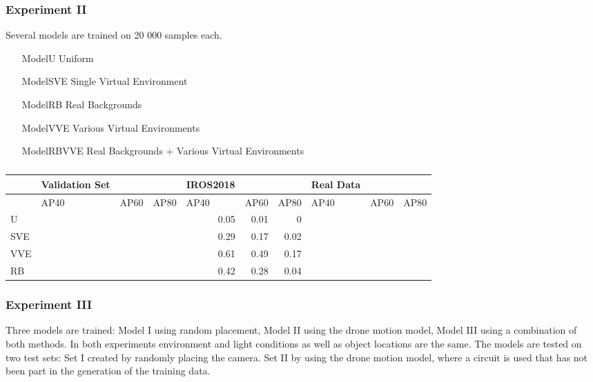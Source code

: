 \subsubsection{Experiment II}

Several models are trained on 20 000 samples each.
\begin{itemize}
	\item[ModelU] Uniform
	\item[ModelSVE] Single Virtual Environment
	\item[ModelRB] Real Backgrounds
	\item[ModelVVE] Various Virtual Environments
	\item[ModelRBVVE] Real Backgrounds + Various Virtual Environments
\end{itemize}


\begin{table}[htbp]
	\caption{}
	\begin{tabular}{|l|l|l|l|r|r|r|l|l|l|}
		\hline
		& Validation Set &  &  & \multicolumn{1}{l|}{IROS2018} & \multicolumn{1}{l|}{} & \multicolumn{1}{l|}{} & Real Data &  &  \\ \hline
		& AP40 & AP60 & AP80 & \multicolumn{1}{l|}{AP40} & \multicolumn{1}{l|}{AP60} & \multicolumn{1}{l|}{AP80} & AP40 & AP60 & AP80 \\ \hline
		U &  &  &  & 0.05 & 0.01 & 0 &  &  &  \\ \hline
		SVE &  &  &  & 0.29 & 0.17 & 0.02 &  &  &  \\ \hline
		VVE &  &  &  & 0.61 & 0.49 & 0.17 &  &  &  \\ \hline
		RB &  &  &  & 0.42 & 0.28 & 0.04 &  &  &  \\ \hline
	\end{tabular}
	\label{tab:env}
\end{table}


\subsubsection{Experiment III}

Three models are trained: Model I using random placement, Model II using the drone motion model, Model III using a combination of both methods. In both experiments environment and light conditions as well as object locations are the same. The models are tested on two test sets: Set I created by randomly placing the camera. Set II by using the drone motion model, where a circuit is used that has not been part in the generation of the training data.


